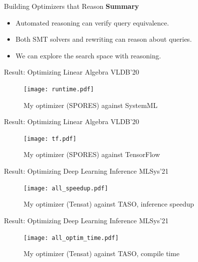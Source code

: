 \documentclass{beamer}
\begin{document}
  \begin{frame}{Building Optimizers that Reason}
    \textbf{Summary}
    \begin{itemize}
      \item Automated reasoning can verify query equivalence.
      \item Both SMT solvers and rewriting can reason about queries.
      \item We can explore the search space with reasoning.
    \end{itemize}
  \end{frame}

  \begin{frame}{Result: Optimizing Linear Algebra}
    VLDB'20~\cite{spores}
    \begin{figure}
        \texttt{[image: runtime.pdf]}
        \caption*{My optimizer (SPORES) against SystemML}
    \end{figure}
  \end{frame}

  \begin{frame}{Result: Optimizing Linear Algebra}
    VLDB'20~\cite{spores}
    \begin{figure}
      \texttt{[image: tf.pdf]}
      \caption*{My optimizer (SPORES) against TensorFlow}
    \end{figure}
  \end{frame}

  \begin{frame}{Result: Optimizing Deep Learning Inference}
    MLSys'21~\cite{tensat}
    \begin{figure}
      \texttt{[image: all\_speedup.pdf]}
      \caption*{My optimizer (Tensat) against TASO, inference speedup}
    \end{figure}
  \end{frame}

  \begin{frame}{Result: Optimizing Deep Learning Inference}
    MLSys'21~\cite{tensat}
    \begin{figure}
      \texttt{[image: all\_optim\_time.pdf]}
      \caption*{My optimizer (Tensat) against TASO, compile time}
    \end{figure}
  \end{frame}
  
\end{document}
